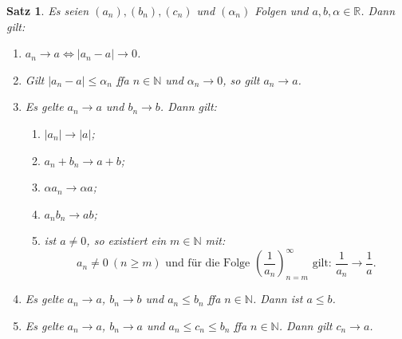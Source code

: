 \documentclass[12pt]{extreport} %
\newcommand{\N}{\mathbb{N}}
\newcommand{\R}{\mathbb{R}}
\theoremstyle{named}
\theoremstyle{itshape}
\newtheorem{satz}[unnamedtheorem]{Satz}
\theoremstyle{normal}
\begin{document}
\begin{satz} \label{2.2:satz}
	Es seien $(a_{n}), (b_{n}), (c_{n})$ und $(\alpha_{n})$ Folgen und $a, b, \alpha \in \R$. Dann gilt:

	\begin{enumerate}
		\item $a_{n} \rightarrow a \iff |a_{n} - a| \rightarrow 0$.
		\item Gilt $|a_{n} - a| \leq \alpha_{n}$ ffa $n \in \N$ und $\alpha_{n} \rightarrow 0$, so gilt $a_{n} \rightarrow a$.
		\item Es gelte $a_{n} \rightarrow a$ und $b_{n} \rightarrow b$. Dann gilt:
			\begin{enumerate}
				\item $|a_{n}| \rightarrow |a|$; 
				\item $a_{n} + b_{n} \rightarrow a + b$;
				\item $\alpha a_{n} \rightarrow \alpha a$;
				\item $a_{n} b_{n} \rightarrow a b$;
				\item ist $a \neq 0$, so existiert ein $m \in \N$ mit:
					$$
						a_{n} \neq 0 ~ (n \geq m) \text{ und für die Folge } 
						\left( \frac{1}{a_{n}} \right)_{n = m}^{\infty} \text{ gilt: } \frac{1}{a_{n}} \rightarrow \frac{1}{a}.
					$$
			\end{enumerate}
		\item Es gelte $a_{n} \rightarrow a$, $b_{n} \rightarrow b$ und $a_{n} \leq b_{n}$ ffa $n \in \N$. Dann ist $a \leq b$.
		\item Es gelte $a_{n} \rightarrow a$, $b_{n} \rightarrow a$ und $a_{n} \leq c_{n} \leq b_{n}$ ffa $n \in \N$. Dann gilt $c_{n} \rightarrow a$. \label{2.2.e:satz}
	\end{enumerate}
\end{satz}
\end{document}
